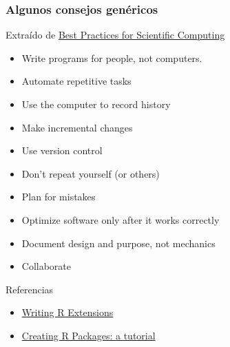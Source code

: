 \documentclass[xcolor={usenames,svgnames,dvipsnames}]{beamer}
\begin{document}
\begin{frame}
\frametitle{Algunos consejos genéricos}
\label{sec-1-3}


Extraído de \href{http://arxiv.org/abs/1210.0530}{Best Practices for Scientific Computing}

\begin{itemize}
\item Write programs for people, not computers.
\item Automate repetitive tasks
\item Use the computer to record history
\item Make incremental changes
\item Use version control
\item Don't repeat yourself (or others)
\item Plan for mistakes
\item Optimize software only after it works correctly
\item Document design and purpose, not mechanics
\item Collaborate
\end{itemize}
\end{frame}
\begin{frame}
\begin{block}{Referencias}
\label{sec-1-4-1}

\begin{itemize}
\item \href{http://cran.r-project.org/doc/manuals/r-release/R-exts.html}{Writing R Extensions}
\item \href{http://cran.r-project.org/doc/contrib/Leisch-CreatingPackages.pdf}{Creating R Packages: a tutorial}
\end{itemize}
\end{block}
\end{frame}
\end{document}
